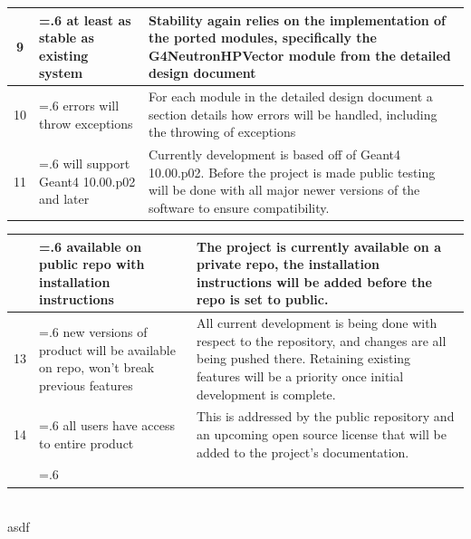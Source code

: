 \documentclass[12pt]{article}
\begin{document}
\begin{table}[h]
\begin{tabularx}{\textwidth}{c>{\hsize=.6\hsize}X>{\hsize=1.4\hsize}X}
9 & at least as stable as existing system & Stability again relies on the implementation of the ported modules, specifically the G4NeutronHPVector module from the detailed design document\\\hline

10 & errors will throw exceptions & For each module in the detailed design document a section details how errors will be handled, including the throwing of exceptions\\\hline

11 & will support Geant4 10.00.p02 and later & Currently development is based off of Geant4 10.00.p02. Before the project is made public testing will be done with all major newer versions of the software to ensure compatibility.\\\hline
\end{tabularx}
\end{table}

\clearpage
\begin{tabularx}{\textwidth}{c>{\hsize=.6\hsize}X>{\hsize=1.4\hsize}X}
\arrayrulecolor{lightgray}
\hline
12 & available on public repo with installation instructions & The project is currently available on a private repo, the installation instructions will be added before the repo is set to public.\\\hline

13 & new versions of product will be available on repo, won't break previous features & All current development is being done with respect to the repository, and changes are all being pushed there. Retaining existing features will be a priority once initial development is complete.\\\hline

14 & all users have access to entire product & This is addressed by the public repository and an upcoming open source license that will be added to the project's documentation.\\
\arrayrulecolor{black}
\bottomrule
\end{tabularx}\\

asdf
\end{document}
